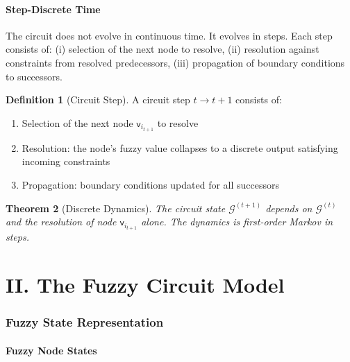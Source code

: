 \documentclass[10pt,twocolumn,a4paper]{article}
\theoremstyle{plain}
\newtheorem{theorem}{Theorem}[section]
\theoremstyle{definition}
\newtheorem{definition}[theorem]{Definition}
\theoremstyle{remark}
\newcommand{\fnode}{\mathsf{v}}
\newcommand{\circuit}{\mathcal{G}}
\begin{document}
\subsection{Step-Discrete Time}

The circuit does not evolve in continuous time. It evolves in steps. Each step consists of: (i) selection of the next node to resolve, (ii) resolution against constraints from resolved predecessors, (iii) propagation of boundary conditions to successors.

\begin{definition}[Circuit Step]
\label{def:step}
A circuit step $t \to t+1$ consists of:
\begin{enumerate}[label=(\roman*)]
    \item Selection of the next node $\fnode_{i_{t+1}}$ to resolve
    \item Resolution: the node's fuzzy value collapses to a discrete output satisfying incoming constraints
    \item Propagation: boundary conditions updated for all successors
\end{enumerate}
\end{definition}

\begin{theorem}[Discrete Dynamics]
\label{thm:discrete}
The circuit state $\circuit^{(t+1)}$ depends on $\circuit^{(t)}$ and the resolution of node $\fnode_{i_{t+1}}$ alone. The dynamics is first-order Markov in steps.
\end{theorem}


\part*{II. The Fuzzy Circuit Model}

\section{Fuzzy State Representation}
\label{sec:circuit_model}

\subsection{Fuzzy Node States}
\end{document}
